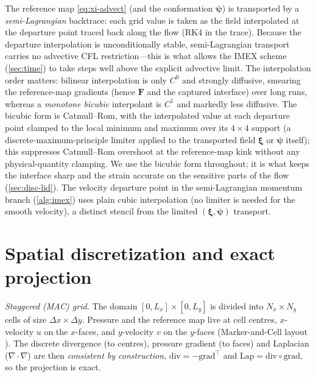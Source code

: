 \documentclass[final,3p,times]{elsarticle}
\theoremstyle{remark}
\newcommand{\xiv}{\bm{\xi}}              %
\newcommand{\Ften}{\bm{F}}              %
\newcommand{\psib}{\bm{\psi}}           %
\newcommand{\grad}{\nabla}
\newcommand{\dive}{\grad\!\cdot\!}
\newcommand{\dx}{\Delta x}
\begin{document}
The reference map \cref{eq:xi-advect} (and the conformation $\psib$) is transported by a
\emph{semi-Lagrangian} backtrace: each grid value is taken as the field interpolated at the
departure point traced back along the flow (RK4 in the trace). Because the departure
interpolation is unconditionally stable, semi-Lagrangian transport carries no advective CFL
restriction---this is what allows the IMEX scheme (\cref{sec:time}) to take steps well
above the explicit advective limit. The interpolation order matters: bilinear interpolation
is only $C^0$ and strongly diffusive, smearing the reference-map gradients (hence $\Ften$ and
the captured interface) over long runs, whereas a \emph{monotone bicubic} interpolant is
$C^1$ and markedly less diffusive. The bicubic form is Catmull--Rom, with the interpolated
value at each departure point clamped to the local minimum and maximum over its $4\times4$
support (a discrete-maximum-principle limiter applied to the transported field $\xiv$ or $\psib$
itself); this suppresses Catmull--Rom overshoot at the reference-map kink without any
physical-quantity clamping. We use the bicubic form throughout; it is what keeps the interface
sharp and the strain accurate on the sensitive parts of the flow (\cref{sec:disc-lid}). The
velocity departure point in the semi-Lagrangian momentum branch (\cref{alg:imex}) uses plain
cubic interpolation (no limiter is needed for the smooth velocity), a distinct stencil from the
limited $(\xiv,\psib)$ transport.


\section{Spatial discretization and exact projection}
\label{sec:discretization}
\emph{Staggered (MAC) grid.}
The domain $[0,L_x]\times[0,L_y]$ is divided into $N_x\times N_y$ cells of size
$\dx\times\Delta y$. Pressure and the reference map live at cell centres,
$x$-velocity $u$ on the $x$-faces, and $y$-velocity $v$ on the $y$-faces
(Marker-and-Cell layout \cite{Harlow1965}). The discrete divergence (to centres),
pressure gradient (to faces) and Laplacian ($\dive\grad$) are then \emph{consistent by
construction}, $\mathrm{div}=-\mathrm{grad}^{\!\top}$ and
$\mathrm{Lap}=\mathrm{div}\circ\mathrm{grad}$, so the projection is exact.
\end{document}
